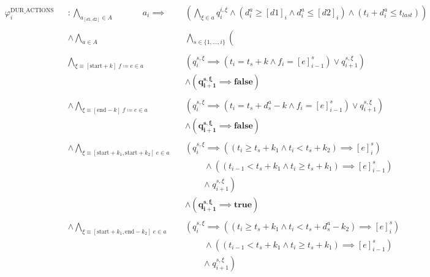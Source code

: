 \documentclass{article}
\begin{document}
\begin{align*}
  &\varphi_{i}^{\text{DUR\_ACTIONS}} &&: \bigwedge\limits_{a_{[d1, d2]} \in A} \;\;\;\;\;\;\;\;\;\;\;\; a_i \implies && \left( \bigwedge\limits_{\xi \in a} q_i^{i, \xi} \land \left(d_i^a \geq [d1]_i \land d_i^a \leq [d2]_i \right) \land \left( t_i + d_i^a \leq t_{last} \right) \right) \\ \\
  & &&\land \bigwedge\limits_{a \in A} && \bigwedge\limits_{s \in \{1, \ldots, i\}} \left( \right.\\ \\
  & && \bigwedge\limits_{\xi \equiv [\text{start}+k] \; f \coloneqq e \in a} &&\left( q_i^{s, \xi} \implies \left( t_i = t_s + k \land f_{i} = [e]_{i-1}^s \right) \lor q_{i+1}^{s, \xi} \right)\\
  & && && \land \boldsymbol{\left( q_{i+1}^{s, \xi} \implies false \right)}\\ \\
  & && \land \bigwedge\limits_{\xi \equiv [\text{end}-k] \; f \coloneqq e \in a} &&\left( q_i^{s, \xi} \implies \left( t_i = t_s + d_s^a - k \land f_{i} = [e]_{i-1}^s \right) \lor q_{i+1}^{s, \xi} \right)\\
  & && && \land \boldsymbol{\left( q_{i+1}^{s, \xi} \implies false \right)}\\ \\
  & && \land \bigwedge\limits_{\xi \equiv [\text{start}+k_1, \text{start}+k_2] \; e \in a} &&\left( q_i^{s, \xi} \implies \left( \left( t_i \geq t_s + k_1 \land t_i < t_s + k_2 \right) \implies [e]_{i}^s \right) \right.\\
  & && && \; \; \; \; \; \; \; \; \land \left( \left( t_{i-1} < t_s + k_1 \land t_i \geq t_s + k_1 \right) \implies [e]_{i-1}^s \right)\\
  & && && \; \; \; \; \; \; \; \; \left. \land \; q_{i+1}^{s, \xi} \right)\\
  & && && \land \boldsymbol{\left( q_{i+1}^{s, \xi} \implies true \right)}\\ \\
  & && \land \bigwedge\limits_{\xi \equiv [\text{start}+k_1, \text{end}-k_2] \; e \in a} &&\left( q_i^{s, \xi} \implies \left( \left( t_i \geq t_s + k_1 \land t_i < t_s + d_s^a - k_2 \right) \implies [e]_{i}^s \right) \right.\\
  & && && \; \; \; \; \; \; \; \; \land \left( \left( t_{i-1} < t_s + k_1 \land t_i \geq t_s + k_1 \right) \implies [e]_{i-1}^s \right)\\
  & && && \; \; \; \; \; \; \; \; \left. \land \; q_{i+1}^{s, \xi} \right)\\

\end{align*}
\end{document}
